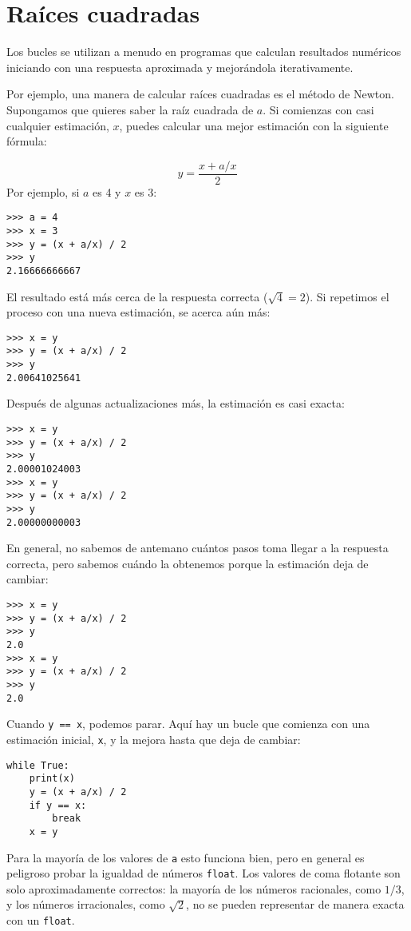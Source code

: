 \documentclass[10pt]{book}
\begin{document}
\section{Raíces cuadradas}
\label{squareroot}

Los bucles se utilizan a menudo en programas que calculan
resultados numéricos iniciando con una respuesta aproximada y
mejorándola iterativamente.

Por ejemplo, una manera de calcular raíces cuadradas es el método de Newton.
Supongamos que quieres saber la raíz cuadrada de $a$.  Si comienzas
con casi cualquier estimación, $x$, puedes calcular una mejor
estimación con la siguiente fórmula:

\[ y = \frac{x + a/x}{2} \]
%
Por ejemplo, si $a$ es 4 y $x$ es 3:

\begin{verbatim}
>>> a = 4
>>> x = 3
>>> y = (x + a/x) / 2
>>> y
2.16666666667
\end{verbatim}
%
El resultado está más cerca de la respuesta correcta ($\sqrt{4} = 2$).  Si
repetimos el proceso con una nueva estimación, se acerca aún más:

\begin{verbatim}
>>> x = y
>>> y = (x + a/x) / 2
>>> y
2.00641025641
\end{verbatim}
%
Después de algunas actualizaciones más, la estimación es casi exacta:

\begin{verbatim}
>>> x = y
>>> y = (x + a/x) / 2
>>> y
2.00001024003
>>> x = y
>>> y = (x + a/x) / 2
>>> y
2.00000000003
\end{verbatim}
%
En general, no sabemos de antemano cuántos pasos toma
llegar a la respuesta correcta, pero sabemos cuándo la obtenemos
porque la estimación
deja de cambiar:

\begin{verbatim}
>>> x = y
>>> y = (x + a/x) / 2
>>> y
2.0
>>> x = y
>>> y = (x + a/x) / 2
>>> y
2.0
\end{verbatim}
%
Cuando {\tt y == x}, podemos parar.  Aquí hay un bucle que comienza
con una estimación inicial, {\tt x}, y la mejora hasta que
deja de cambiar:

\begin{verbatim}
while True:
    print(x)
    y = (x + a/x) / 2
    if y == x:
        break
    x = y
\end{verbatim}
%
Para la mayoría de los valores de {\tt a} esto funciona bien, pero en general es
peligroso probar la igualdad de números {\tt float}.
Los valores de coma flotante son solo aproximadamente correctos:
la mayoría de los números racionales, como $1/3$, y los números irracionales, como
$\sqrt{2}$, no se pueden representar de manera exacta con un {\tt float}.
\end{document}
